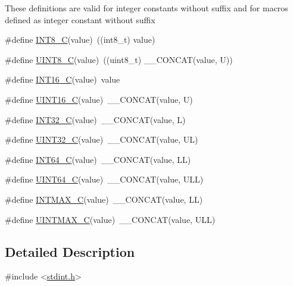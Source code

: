 These definitions are valid for integer constants without suffix and for macros defined as integer constant without suffix \begin{DoxyCompactItemize}
\item 
\#define \hyperlink{group__avr__stdint_gacc666d136a198406538bafb8288f9c1b}{I\+N\+T8\+\_\+C}(value)~((int8\+\_\+t) value)
\item 
\#define \hyperlink{group__avr__stdint_gacb579905e23358f9a5035b075c57ffcd}{U\+I\+N\+T8\+\_\+C}(value)~((uint8\+\_\+t) \+\_\+\+\_\+\+C\+O\+N\+C\+AT(value, U))
\item 
\#define \hyperlink{group__avr__stdint_ga1e6d0a954851b2f07b54a2178dc6eb40}{I\+N\+T16\+\_\+C}(value)~value
\item 
\#define \hyperlink{group__avr__stdint_gab93c67f535ddedd6e88a9a8030b333f1}{U\+I\+N\+T16\+\_\+C}(value)~\+\_\+\+\_\+\+C\+O\+N\+C\+AT(value, U)
\item 
\#define \hyperlink{group__avr__stdint_ga1ddf83530d986214005d1e766f036b28}{I\+N\+T32\+\_\+C}(value)~\+\_\+\+\_\+\+C\+O\+N\+C\+AT(value, L)
\item 
\#define \hyperlink{group__avr__stdint_gad76f76a71e9ffc13963ee895d1828b2c}{U\+I\+N\+T32\+\_\+C}(value)~\+\_\+\+\_\+\+C\+O\+N\+C\+AT(value, UL)
\item 
\#define \hyperlink{group__avr__stdint_gaab7df05e4698e14dbef512294ff39203}{I\+N\+T64\+\_\+C}(value)~\+\_\+\+\_\+\+C\+O\+N\+C\+AT(value, LL)
\item 
\#define \hyperlink{group__avr__stdint_gae770776c04e6d959364d2612ddfce99d}{U\+I\+N\+T64\+\_\+C}(value)~\+\_\+\+\_\+\+C\+O\+N\+C\+AT(value, U\+LL)
\item 
\#define \hyperlink{group__avr__stdint_gaefea1274b2789b420969856ac1a8f19e}{I\+N\+T\+M\+A\+X\+\_\+C}(value)~\+\_\+\+\_\+\+C\+O\+N\+C\+AT(value, LL)
\item 
\#define \hyperlink{group__avr__stdint_ga97a030e600e111b2b5981b4c39265ab6}{U\+I\+N\+T\+M\+A\+X\+\_\+C}(value)~\+\_\+\+\_\+\+C\+O\+N\+C\+AT(value, U\+LL)
\end{DoxyCompactItemize}


\subsection{Detailed Description}

\begin{DoxyCode}
\textcolor{preprocessor}{#include <\hyperlink{stdint_8h}{stdint.h}>} 
\end{DoxyCode}


